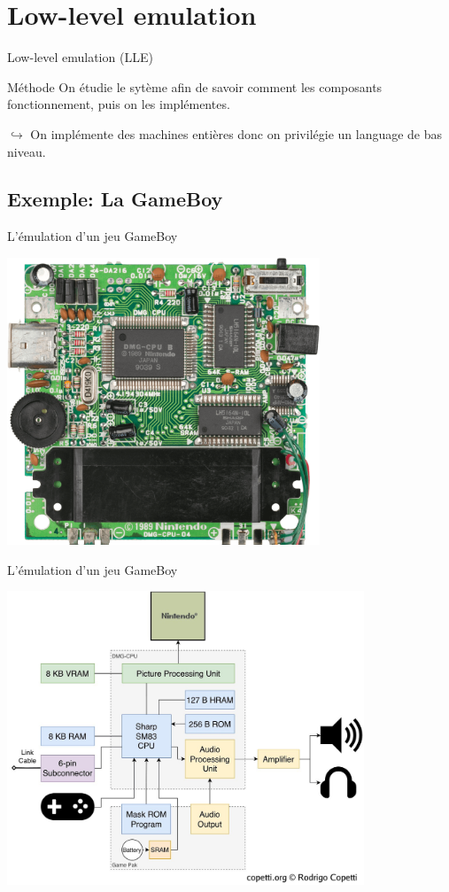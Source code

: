 \documentclass{beamer}
\begin{document}
    \section{Low-level emulation}
    \begin{frame}{Low-level emulation (LLE)}
        \begin{exampleblock}{Méthode}
            On étudie le sytème afin de savoir comment les composants fonctionnement, puis on les implémentes.
        \end{exampleblock}
        $\hookrightarrow$ On implémente des machines entières donc on privilégie un language de bas niveau.
    \end{frame}

    \subsection{Exemple: La GameBoy}
    \begin{frame}{L'émulation d'un jeu GameBoy}
        \begin{center}
            \includegraphics[width=0.7\textwidth]{images/carte_mere.png}
        \end{center}
    \end{frame}

    \begin{frame}{L'émulation d'un jeu GameBoy}
        \begin{center}
            \includegraphics[width=0.8\textwidth]{images/diagrame.png}
        \end{center}
    \end{frame}
\end{document}
